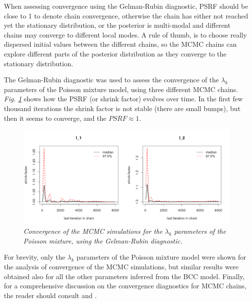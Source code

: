 When assessing convergence using the Gelman-Rubin diagnostic, PSRF should be close to 1 to denote chain convergence, otherwise the chain has either not reached yet the stationary distribution, or the posterior is multi-modal and different chains may converge to different local modes. A rule of thumb, is to choose really dispersed initial values between the different chains, so the MCMC chains can explore different parts of the posterior distribution as they converge to the stationary distribution.

The Gelman-Rubin diagnostic was used to assess the convergence of the $\lambda_{k}$ parameters of the Poisson mixture model, using three different MCMC chains. \emph{Fig. \ref{psrf-lambda-pic}} shows how the PSRF (or shrink factor) evolves over time. In the first few thousand iterations the shrink factor is not stable (\ie there are small bumps), but then it seems to converge, and the $PSRF \approx 1$.  
\begin{figure}[!ht]
\begin{center}
 \includegraphics[scale = 0.41]{images/psrf-l.png}
\caption{\emph{Convergence of the MCMC simulations for the $\lambda_{k}$ parameters of the Poisson mixture, using the Gelman-Rubin diagnostic.}}
\label{psrf-lambda-pic}
\end{center}
\end{figure}

For brevity, only the $\lambda_{k}$ parameters of the Poisson mixture model were shown for the analysis of convergence of the MCMC simulations, but similar results were obtained also for all the other parameters inferred from the BCC model. Finally, for a comprehensive discussion on the convergence diagnostics for MCMC chains, the reader should consult \citet{Brooks1999} and \citet{Robert2009}.